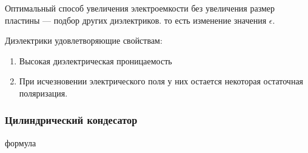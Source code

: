\documentclass[../main.tex]{subfiles}
\begin{document}
Оптимальный способ увеличения электроемкости без увеличения размер пластины --- подбор других диэлектриков. то есть
изменение значения $\epsilon$.

 Диэлектрики удовлетворяющие свойствам:
\begin{enumerate}
    \item Высокая диэлектрическая проницаемость
    \item При исчезновении электрического поля у них остается некоторая остаточная поляризация.
\end{enumerate}

\subsubsection{Цилиндрический кондесатор}

формула
\end{document}
